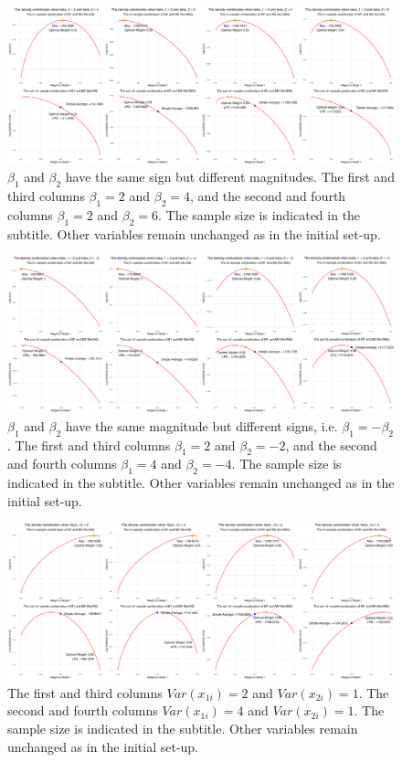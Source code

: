 \documentclass{monashthesis}
\begin{document}
\begin{figure}[ht]
\centering
\includegraphics[scale=0.18, angle=90]{figures/betamag11.jpg}
\caption{$\beta_1$ and $\beta_2$ have the same sign but different magnitudes. The first and third columns $\beta_1=2$ and $\beta_2=4$, and the second and fourth columns $\beta_1=2$ and $\beta_2=6$. The sample size is indicated in the subtitle. Other variables remain unchanged as in the initial set-up.}
\label{fig:magnitude}
\end{figure}

\begin{figure}[ht]
\centering
\includegraphics[scale=0.18, angle=90]{figures/betasign11.jpg}
\caption{$\beta_1$ and $\beta_2$ have the same magnitude but different signs, i.e. $\beta_1=-\beta_2$. The first and third columns $\beta_1=2$ and $\beta_2=-2$, and the second and fourth columns $\beta_1=4$ and $\beta_2=-4$. The sample size is indicated in the subtitle. Other variables remain unchanged as in the initial set-up.}
\label{fig:sign}
\end{figure}

\begin{figure}[ht]
\centering
\includegraphics[scale=0.18, angle=90]{figures/var11.jpg}
\caption{The first and third columns $Var(x_{1i}) = 2$ and $Var(x_{2i}) = 1$. The second and fourth columns $Var(x_{1i}) = 4$ and $Var(x_{2i}) = 1$. The sample size is indicated in the subtitle. Other variables remain unchanged as in the initial set-up.}
\label{fig:variance}
\end{figure}

\printbibliography[title={Reference}]
\end{document}

